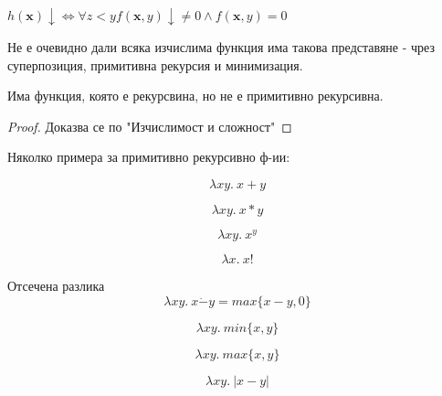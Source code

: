 \begin{notation}
    $h(\textbf{x})\downarrow \iff \forall z < y f(\textbf{x}, y)\downarrow \neq 0 \land f(\textbf{x}, y) = 0$
\end{notation}
Не е очевидно дали всяка изчислима функция има такова представяне - чрез суперпозиция, примитивна рекурсия и минимизация.
\begin{proposition}
    Има функция, която е рекурсвина, но не е примитивно рекурсивна.
\end{proposition}
\begin{proof}
    Доказва се по "Изчислимост и сложност"
\end{proof}
Няколко примера за примитивно рекурсивно ф-ии:
\begin{example}
    \begin{equation*}
        \lambda x y.\ x+y
    \end{equation*}
\end{example}
\begin{example}
    \begin{equation*}
        \lambda x y.\ x*y
    \end{equation*}
\end{example}
\begin{example}
    \begin{equation*}
        \lambda x y.\ x^y
    \end{equation*}
\end{example}
\begin{example}
    \begin{equation*}
        \lambda x.\ x!
    \end{equation*}
\end{example}
\begin{example}
    Отсечена разлика
    \begin{equation*}
        \lambda x y.\ x\dot{-}y = max\{x-y, 0\}
    \end{equation*}
\end{example}
\begin{example}
    \begin{equation*}
        \lambda x y.\ min\{x, y\}
    \end{equation*}
\end{example}
\begin{example}
    \begin{equation*}
        \lambda x y.\ max\{x, y\}
    \end{equation*}
\end{example}
\begin{example}
    \begin{equation*}
        \lambda x y.\ |x - y|
    \end{equation*}
\end{example}
